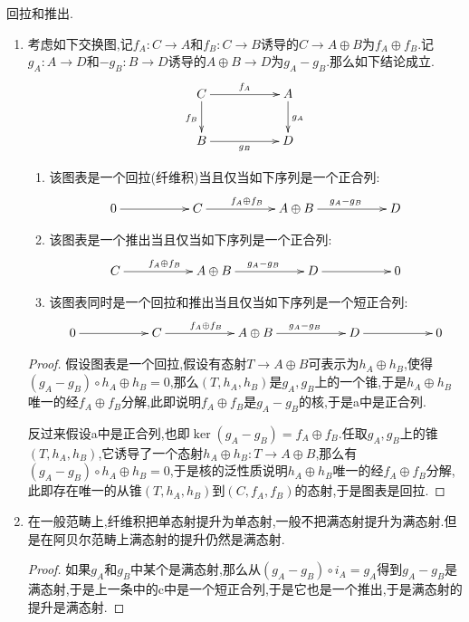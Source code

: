 回拉和推出.
\begin{enumerate}
	\item 考虑如下交换图,记$f_A:C\to A$和$f_B:C\to B$诱导的$C\to A\oplus B$为$f_A\oplus f_B$.记$g_A:A\to D$和$-g_B:B\to D$诱导的$A\oplus B\to D$为$g_A-g_B$.那么如下结论成立.
	$$\xymatrix{C\ar[rr]^{f_A}\ar[d]_{f_B}&&A\ar[d]^{g_A}\\B\ar[rr]_{g_B}&&D}$$
	\begin{enumerate}
		\item 该图表是一个回拉(纤维积)当且仅当如下序列是一个正合列:
		$$\xymatrix{0\ar[rr]&&C\ar[rr]^{f_A\oplus f_B}&&A\oplus B\ar[rr]^{g_A-g_B}&&D}$$
		\item 该图表是一个推出当且仅当如下序列是一个正合列:
		$$\xymatrix{C\ar[rr]^{f_A\oplus f_B}&&A\oplus B\ar[rr]^{g_A-g_B}&&D\ar[rr]&&0}$$
		\item 该图表同时是一个回拉和推出当且仅当如下序列是一个短正合列:
		$$\xymatrix{0\ar[rr]&&C\ar[rr]^{f_A\oplus f_B}&&A\oplus B\ar[rr]^{g_A-g_B}&&D\ar[rr]&&0}$$
	\end{enumerate}
    \begin{proof}
    	
    	假设图表是一个回拉,假设有态射$T\to A\oplus B$可表示为$h_A\oplus h_B$,使得$(g_A-g_B)\circ h_A\oplus h_B=0$,那么$(T,h_A,h_B)$是$g_A,g_B$上的一个锥,于是$h_A\oplus h_B$唯一的经$f_A\oplus f_B$分解,此即说明$f_A\oplus f_B$是$g_A-g_B$的核,于是a中是正合列.
    	
    	反过来假设a中是正合列,也即$\ker(g_A-g_B)=f_A\oplus f_B$.任取$g_A,g_B$上的锥$(T,h_A,h_B)$,它诱导了一个态射$h_A\oplus h_B:T\to A\oplus B$,那么有$(g_A-g_B)\circ h_A\oplus h_B=0$,于是核的泛性质说明$h_A\oplus h_B$唯一的经$f_A\oplus f_B$分解,此即存在唯一的从锥$(T,h_A,h_B)$到$(C,f_A,f_B)$的态射,于是图表是回拉.
    \end{proof}
    \item 在一般范畴上,纤维积把单态射提升为单态射,一般不把满态射提升为满态射.但是在阿贝尔范畴上满态射的提升仍然是满态射.
    \begin{proof}
    	
    	如果$g_A$和$g_B$中某个是满态射,那么从$(g_A-g_B)\circ i_A=g_A$得到$g_A-g_B$是满态射,于是上一条中的c中是一个短正合列,于是它也是一个推出,于是满态射的提升是满态射.
    \end{proof}
\end{enumerate}

